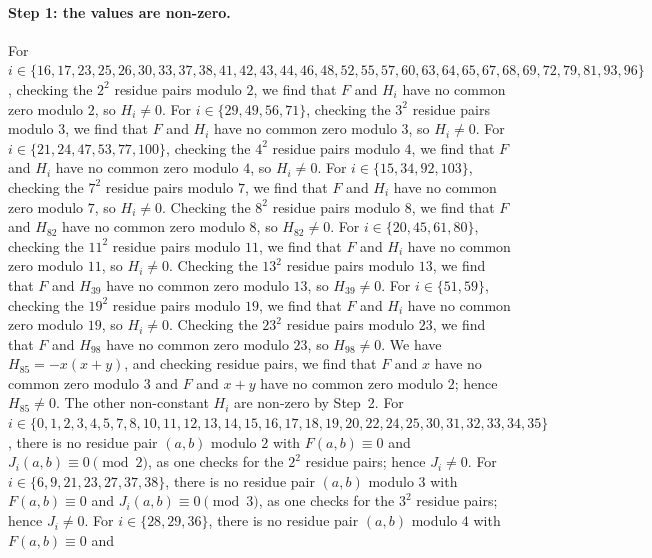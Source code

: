 \documentclass[11pt]{article}
\begin{document}
\paragraph{Step 1: the values are non-zero.} For $i\in\{16,\allowbreak 17,\allowbreak 23,\allowbreak 25,\allowbreak 26,\allowbreak 30,\allowbreak 33,\allowbreak 37,\allowbreak 38,\allowbreak 41,\allowbreak 42,\allowbreak 43,\allowbreak 44,\allowbreak 46,\allowbreak 48,\allowbreak 52,\allowbreak 55,\allowbreak 57,\allowbreak 60,\allowbreak 63,\allowbreak 64,\allowbreak 65,\allowbreak 67,\allowbreak 68,\allowbreak 69,\allowbreak 72,\allowbreak 79,\allowbreak 81,\allowbreak 93,\allowbreak 96\}$, checking the $2^2$ residue pairs modulo $2$, we find that $F$ and $H_i$ have no common zero modulo $2$, so $H_i\neq0$. For $i\in\{29,\allowbreak 49,\allowbreak 56,\allowbreak 71\}$, checking the $3^2$ residue pairs modulo $3$, we find that $F$ and $H_i$ have no common zero modulo $3$, so $H_i\neq0$. For $i\in\{21,\allowbreak 24,\allowbreak 47,\allowbreak 53,\allowbreak 77,\allowbreak 100\}$, checking the $4^2$ residue pairs modulo $4$, we find that $F$ and $H_i$ have no common zero modulo $4$, so $H_i\neq0$. For $i\in\{15,\allowbreak 34,\allowbreak 92,\allowbreak 103\}$, checking the $7^2$ residue pairs modulo $7$, we find that $F$ and $H_i$ have no common zero modulo $7$, so $H_i\neq0$. Checking the $8^2$ residue pairs modulo $8$, we find that $F$ and $H_{82}$ have no common zero modulo $8$, so $H_{82}\neq0$. For $i\in\{20,\allowbreak 45,\allowbreak 61,\allowbreak 80\}$, checking the $11^2$ residue pairs modulo $11$, we find that $F$ and $H_i$ have no common zero modulo $11$, so $H_i\neq0$. Checking the $13^2$ residue pairs modulo $13$, we find that $F$ and $H_{39}$ have no common zero modulo $13$, so $H_{39}\neq0$. For $i\in\{51,\allowbreak 59\}$, checking the $19^2$ residue pairs modulo $19$, we find that $F$ and $H_i$ have no common zero modulo $19$, so $H_i\neq0$. Checking the $23^2$ residue pairs modulo $23$, we find that $F$ and $H_{98}$ have no common zero modulo $23$, so $H_{98}\neq0$. We have $H_{85}=-x(x+y)$, and checking residue pairs, we find that $F$ and $x$ have no common zero modulo $3$ and $F$ and $x+y$ have no common zero modulo $2$; hence $H_{85}\neq0$. The other non-constant $H_i$ are non-zero by Step~2. For $i\in\{0,\allowbreak 1,\allowbreak 2,\allowbreak 3,\allowbreak 4,\allowbreak 5,\allowbreak 7,\allowbreak 8,\allowbreak 10,\allowbreak 11,\allowbreak 12,\allowbreak 13,\allowbreak 14,\allowbreak 15,\allowbreak 16,\allowbreak 17,\allowbreak 18,\allowbreak 19,\allowbreak 20,\allowbreak 22,\allowbreak 24,\allowbreak 25,\allowbreak 30,\allowbreak 31,\allowbreak 32,\allowbreak 33,\allowbreak 34,\allowbreak 35\}$, there is no residue pair $(a,b)$ modulo $2$ with $F(a,b)\equiv0$ and $J_i(a,b)\equiv0\pmod{2}$, as one checks for the $2^2$ residue pairs; hence $J_i\neq0$. For $i\in\{6,\allowbreak 9,\allowbreak 21,\allowbreak 23,\allowbreak 27,\allowbreak 37,\allowbreak 38\}$, there is no residue pair $(a,b)$ modulo $3$ with $F(a,b)\equiv0$ and $J_i(a,b)\equiv0\pmod{3}$, as one checks for the $3^2$ residue pairs; hence $J_i\neq0$. For $i\in\{28,\allowbreak 29,\allowbreak 36\}$, there is no residue pair $(a,b)$ modulo $4$ with $F(a,b)\equiv0$ and 
\end{document}

